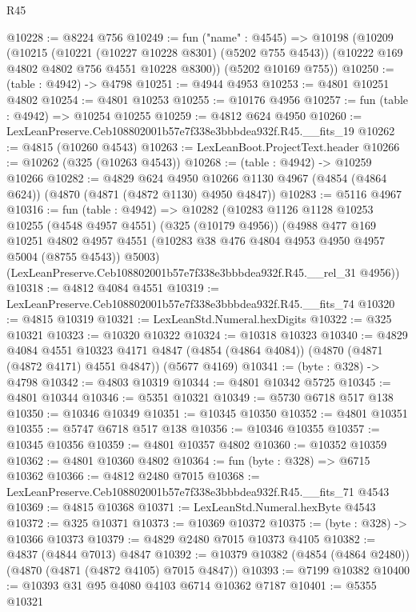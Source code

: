 \begin{lexlean}{R45}
\begin{coremodule}
@10228 := @8224 @756
@10249 := fun ("name" : @4545) =>
  @10198
    (@10209
      (@10215
        (@10221 (@10227 @10228 @8301) (@5202 @755 @4543))
        (@10222 @169 @4802 @4802 @756 @4551 @10228 @8300))
      (@5202 @10169 @755))
@10250 := (table : @4942) -> @4798
@10251 := @4944 @4953
@10253 := @4801 @10251 @4802
@10254 := @4801 @10253
@10255 := @10176 @4956
@10257 := fun (table : @4942) => @10254 @10255
@10259 := @4812 @624 @4950
@10260 := LexLeanPreserve.Ceb108802001b57e7f338e3bbbdea932f.R45.__fits_19
@10262 := @4815 (@10260 @4543)
@10263 := LexLeanBoot.ProjectText.header
@10266 := @10262 (@325 (@10263 @4543))
@10268 := (table : @4942) -> @10259 @10266
@10282 := @4829
    @624
    @4950
    @10266
    @1130
    @4967
    (@4854 (@4864 @624))
    (@4870 (@4871 (@4872 @1130) @4950 @4847))
@10283 := @5116 @4967
@10316 := fun (table : @4942) =>
  @10282
    (@10283
      @1126
      @1128
      @10253
      @10255
      (@4548 @4957 @4551)
      (@325 (@10179 @4956))
      (@4988
        @477
        @169
        @10251
        @4802
        @4957
        @4551
        (@10283 @38 @476 @4804 @4953 @4950 @4957 @5004 (@8755 @4543))
        @5003)
      (LexLeanPreserve.Ceb108802001b57e7f338e3bbbdea932f.R45.__rel_31 @4956))
@10318 := @4812 @4084 @4551
@10319 := LexLeanPreserve.Ceb108802001b57e7f338e3bbbdea932f.R45.__fits_74
@10320 := @4815 @10319
@10321 := LexLeanStd.Numeral.hexDigits
@10322 := @325 @10321
@10323 := @10320 @10322
@10324 := @10318 @10323
@10340 := @4829
    @4084
    @4551
    @10323
    @4171
    @4847
    (@4854 (@4864 @4084))
    (@4870 (@4871 (@4872 @4171) @4551 @4847))
    (@5677 @4169)
@10341 := (byte : @328) -> @4798
@10342 := @4803 @10319
@10344 := @4801 @10342 @5725
@10345 := @4801 @10344
@10346 := @5351 @10321
@10349 := @5730 @6718 @517 @138
@10350 := @10346 @10349
@10351 := @10345 @10350
@10352 := @4801 @10351
@10355 := @5747 @6718 @517 @138
@10356 := @10346 @10355
@10357 := @10345 @10356
@10359 := @4801 @10357 @4802
@10360 := @10352 @10359
@10362 := @4801 @10360 @4802
@10364 := fun (byte : @328) => @6715 @10362
@10366 := @4812 @2480 @7015
@10368 := LexLeanPreserve.Ceb108802001b57e7f338e3bbbdea932f.R45.__fits_71 @4543
@10369 := @4815 @10368
@10371 := LexLeanStd.Numeral.hexByte @4543
@10372 := @325 @10371
@10373 := @10369 @10372
@10375 := (byte : @328) -> @10366 @10373
@10379 := @4829 @2480 @7015 @10373 @4105
@10382 := @4837 (@4844 @7013) @4847
@10392 := @10379 @10382 (@4854 (@4864 @2480)) (@4870 (@4871 (@4872 @4105) @7015 @4847))
@10393 := @7199 @10382
@10400 := @10393 @31 @95 @4080 @4103 @6714 @10362 @7187
@10401 := @5355 @10321

\end{coremodule}
\end{lexlean}
